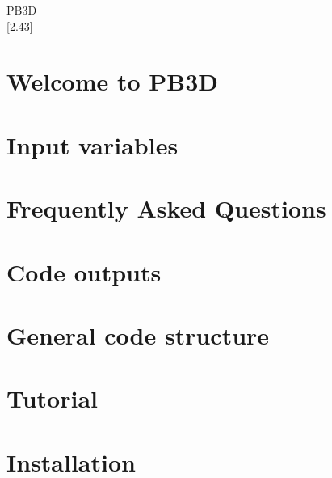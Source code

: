 \documentclass[twoside]{book}
\newcommand{\+}{\discretionary{\mbox{\scriptsize$\hookleftarrow$}}{}{}}
\newcommand{\clearemptydoublepage}{%
  \newpage{\pagestyle{empty}\cleardoublepage}%
}
\begin{document}
\hypersetup{pageanchor=false,
             bookmarksnumbered=true,
             pdfencoding=unicode
            }
\begin{titlepage}
\vspace*{7cm}
\begin{center}%
{\color{stylecolor} \TitleFont\fontsize{72}{80} \selectfont P\+B3D \\}
\vspace*{1cm}
{\large \mbox{[}2.\+43\mbox{]} }\\
\vspace*{1cm}
\end{center}
\end{titlepage}
\clearemptydoublepage
{}
\tableofcontents
\clearemptydoublepage
{}
\hypersetup{pageanchor=true}

\chapter{Welcome to P\+B3D}
\label{index}\hypertarget{index}{}
\chapter{Input variables}
\label{page_inputs}

\chapter{Frequently Asked Questions}
\label{page_faq}

\chapter{Code outputs}
\label{page_outputs}

\chapter{General code structure}
\label{page_overview}

\chapter{Tutorial}
\label{page_tutorial}

\chapter{Installation}
\label{page_installation}

\end{document}
